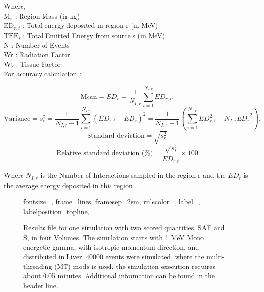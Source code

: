 \documentclass[letterpaper,12pt]{article}
\begin{document}
Where,\\
$ \text{M}_{r} $ : Region Mass (in kg) \\
$ \text{ED}_{r,t} $ : Total energy deposited in region r (in MeV) \\
$ \text{TEE}_{s} $ : Total Emitted Energy from source s (in MeV)  \\
N : Number of Events \\
Wr : Radiation Factor \\
Wt : Tissue Factor \\

For accuracy calculation : 

\begin{equation}
    \label{eq:Mean}
    \text{Mean} = \overline{ED_{r}} = \frac{1}{N_{I,r}} \sum_{i=1}^{N_{I,r}} ED_{r,i}.
\end{equation} 
\begin{equation}
    \label{eq:Var}
    \text{Variance} = s_r^2 = \frac{1}{N_{I,r} - 1} \sum_{i=1}^{N_{I,r}} \left ( ED_{r,i} - \overline{ED_{r}} \right )^2 =\frac{1}{N_{I,r} - 1} \left ( \sum_{i=1}^{N_{I,r}} ED_{r,i}^2 - N_{I,r}\overline{ED_{r}}^2 \right ).
\end{equation} 
\begin{equation}
    \label{eq:SD}
    \text{Standard deviation} = \sqrt{s_r^2} 
\end{equation} 
\begin{equation}
    \label{eq:RelSD}
    \text{Relative standard deviation (\%)} = \frac{\sqrt{s_r^2}}{\overline{ED_{r,t}}}\times 100
\end{equation} 


Where $N_{I,r}$ is the Number of Interactions sampled in the region r and the $ED_r$ is the average energy deposited in this region.


\begin{figure}[H] 
\begin{adjustbox}{max width=\linewidth, margin= 5 , bgcolor = ColorTextFile ,  margin= 1, bgcolor = black}
  {fontsize=\footnotesize,
  frame=lines,
  framesep=2em,
  rulecolor=\color{Gray},
  label=,
  labelposition=topline,
  }
\end{adjustbox}
  \caption{Results file for one simulation with two scored quantities, SAF and S, in four Volumes. The simulation starts with 1 MeV Mono energetic gamma, with isotropic momentum direction, and distributed in Liver. 40000 events were simulated, where the multi-threading (MT) mode is used, the simulation execution requires about 0.05 minutes. Additional information can be found in the header line.} 
  \label{ResultFile}
\end{figure}
\end{document}
